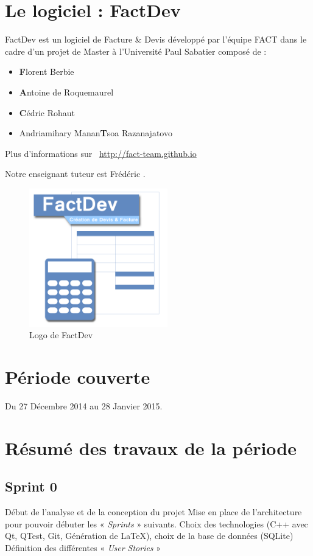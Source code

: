 \documentclass[12pt,a4paper,openany]{article}
\begin{document}
	\thispagestyle{empty} %
	\titleBC 
	\newpage
	\setcounter{tocdepth}{1}
	\setcounter{secnumdepth}{3}
	
	\tableofcontents
	\newpage
	\section{Le logiciel : FactDev}
	FactDev est un logiciel de Facture \& Devis développé par l'équipe FACT dans le cadre d'un projet de Master à l'Université Paul Sabatier composé de : 
	\begin{itemize}
		\item \textbf{F}lorent Berbie
		\item \textbf{A}ntoine de Roquemaurel
		\item \textbf{C}édric Rohaut
		\item Andriamihary Manan\textbf{T}soa Razanajatovo
	\end{itemize}

	Plus d’informations sur \Mundus~\url{http://fact-team.github.io}

	Notre enseignant tuteur est Frédéric .

	\begin{figure}[H]
		\centering
		\includegraphics[width=6cm]{../FACTDev.png}
		\caption{Logo de FactDev}
	\end{figure}

	\section{Période couverte}
	Du 27 Décembre 2014 au 28 Janvier 2015.

	\section{Résumé des travaux de la période}
	\subsection{Sprint 0}
	Début de l'analyse et de la conception du projet
	Mise en place de l'architecture pour pouvoir débuter les « \textit{Sprints} » suivants. 
	Choix des technologies (C++ avec Qt, QTest, Git, Génération de \LaTeX{}), choix de la base de données (SQLite)
	Définition des différentes « \textit{User Stories} »
\end{document}
